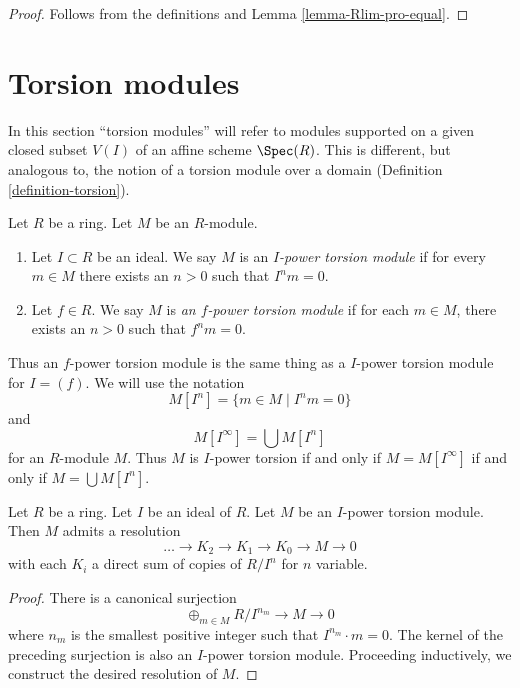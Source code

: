\begin{proof}
Follows from the definitions and Lemma \ref{lemma-Rlim-pro-equal}.
\end{proof}








\section{Torsion modules}
\label{section-torsion}

\noindent
In this section ``torsion modules'' will refer to modules supported
on a given closed subset $V(I)$ of an affine scheme $\Spec(R)$.
This is different, but analogous to, the notion of a torsion module
over a domain (Definition \ref{definition-torsion}).

\begin{definition}
\label{definition-f-power-torsion}
Let $R$ be a ring. Let $M$ be an $R$-module.
\begin{enumerate}
\item Let $I \subset R$ be an ideal. We say $M$ is an
{\it $I$-power torsion module} if for every $m \in M$ there exists an $n > 0$
such that $I^n m = 0$.
\item Let $f \in R$. We say $M$ is
{\it an $f$-power torsion module} if for each
$m \in M$, there exists an $n > 0$ such that $f^n m = 0$.
\end{enumerate}
\end{definition}

\noindent
Thus an $f$-power torsion module is the same thing as a $I$-power torsion
module for $I = (f)$. We will use the notation
$$
M[I^n] = \{m \in M \mid I^nm = 0\}
$$
and
$$
M[I^\infty] = \bigcup M[I^n]
$$
for an $R$-module $M$. Thus $M$ is $I$-power torsion if and only if
$M = M[I^\infty]$ if and only if $M = \bigcup M[I^n]$.

\begin{lemma}
\label{lemma-I-power-torsion-presentation}
Let $R$ be a ring.
Let $I$ be an ideal of $R$.
Let $M$ be an $I$-power torsion module.
Then $M$ admits a resolution
$$
\ldots \to K_2 \to K_1 \to K_0 \to M \to 0
$$
with each $K_i$ a direct sum of copies of $R/I^n$ for $n$ variable.
\end{lemma}

\begin{proof}
There is a canonical surjection
$$
\oplus_{m \in M} R/I^{n_m} \to M \to 0
$$
where $n_m$ is the smallest positive integer such that $I^{n_m} \cdot m = 0$.
The kernel of the preceding surjection is also an $I$-power torsion module.
Proceeding inductively, we construct the desired resolution of $M$.
\end{proof}


